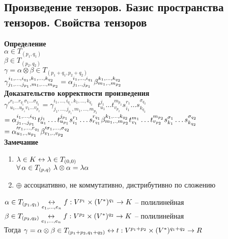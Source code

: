 \documentclass[12pt]{article}
\begin{document}
\subsection{Произведение тензоров. Базис пространства тензоров. Свойства тензоров}
\textbf{Определение}\\
$\alpha \in T_{(p_1, q_1)}$\\
$\beta \in T_{(p_2, q_2)}$\\
$\gamma = \alpha \otimes \beta \in T_{(p_1+q_1, p_2+q_2)}$\\
$\gamma_{j_1,\ldots,j_{p_1},m_1, \ldots, m_{p_2}}^{i_1,\ldots, i_{q_1},k_1,\ldots,k_{q_2}} = \alpha_{j_1, \ldotp, j_{p_1}}^{i_1, \ldots, i_{q_1}}\beta_{m_1, \ldotp, m_{p_2}}^{k_1, \ldots, k_{q_2}}$\\
\textbf{Доказательство корректности произведения}\\
$\gamma'^{r_1 \ldots r_{q_1} \sigma_1 \ldots \sigma_{q_2}}_{u_1\ldots u_{p_1}v_1\ldots v_{p_2}} = \gamma_{j_1,\ldots,j_{p_1},m_1, \ldots, m_{p_2}}^{i_1,\ldots, i_{q_1},k_1,\ldots,k_{q_2}} t_{u_1}^{j_1}\ldots t_{v_{p_2}}^{m_{p_2}} s_{i_1}^{r_1}\ldots s_{k_{q_2}}^{\sigma_{q_2}}$\\
$ = \alpha_{j_1, \ldotp, j_{p_1}}^{i_1, \ldots, i_{q_1}}t_{u_1}^{j_1}\ldots t_{u_{p_1}}^{j_{p_1}}s_{i_1}^{r_1}\ldots s_{r_{q_1}}^{r_{q_1}}\beta_{m_1, \ldotp, m_{p_2}}^{k_1, \ldots, k_{q_2}}t_{v_1}^{m_1}\ldots t_{v_{p_2}}^{m_{p_2}}s_{k_1}^{\sigma_1}\ldots s_{k_{q_2}}^{\sigma_{q_2}}$\\
$ = \alpha'^{r_1, \ldots, r_{q_1}}_{u_1, \ldotp, u_{p_1}}\beta'^{\sigma_1, \ldots, \sigma_{q_2}}_{v_1, \ldotp, v_{p_2}}$\\
\textbf{Замечание}
\begin{enumerate}
    \item $\lambda \in K \leftrightarrow \lambda \in T_{(0,0)}$\\
    $\forall\, \alpha \in T_{(p,q)}\ \lambda \otimes \alpha = \lambda\alpha$
    \item $\oplus$ ассоциативно, не коммутативно, дистрибутивно по сложению
\end{enumerate}
$\alpha \in T_{(p_1, q_1)} \underset{e_1, \ldots, e_n}{\leftrightarrow} f: V^{p_1}\times (V^*)^{q_1} \rightarrow K$ -- полилинейная\\
$\beta \in T_{(p_2, q_2)} \underset{e_1, \ldots, e_n}{\leftrightarrow} f: V^{p_2}\times (V^*)^{q_2} \rightarrow K$ -- полилинейная\\
Тогда $\gamma = \alpha \otimes \beta \in T_{(p_1 + p_2, q_1 + q_2)} \leftrightarrow t: V^{p_1+p_2}\times (V^*)^{q_1+q_2} \rightarrow R$\\
\end{document}
